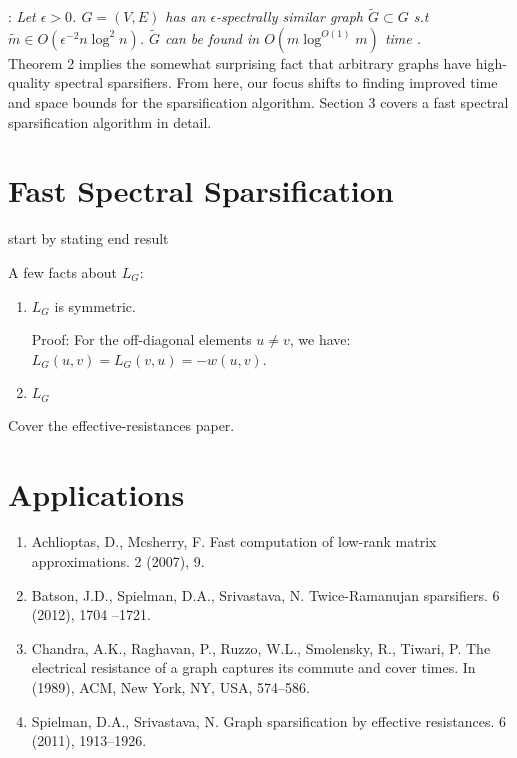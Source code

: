 \documentclass{article}
\begin{document}
\noindent
{}: \textit{Let $\epsilon > 0$. $G = (V,
E)$ has an $\epsilon$-spectrally similar graph $\tilde{G} \subset G$ s.t
$\tilde{m} \in O(\epsilon^{-2}n\log^2 n)$. $\tilde{G}$ can be found in
$O(m\log^{O(1)}m)$ time \cite{SpielmanTeng} \cite{TheSurvey}.} \\

Theorem 2 implies the somewhat surprising fact that arbitrary graphs have
high-quality spectral sparsifiers. From here, our focus shifts to finding
improved time and space bounds for the sparsification algorithm. Section 3
covers a fast spectral sparsification algorithm in detail.

\section{Fast Spectral Sparsification}

start by stating end result

A few facts about $L_G$:
\begin{enumerate}[1.]
    \item $L_G$ is symmetric.

        Proof: For the off-diagonal elements $u \not= v$, we have: $L_G(u,
        v) = L_G(v, u) = -w(u, v)$.

    \item $L_G$ 
\end{enumerate}

Cover the effective-resistances paper.

\section{Applications}




\begin{enumerate}[1.]
    \item Achlioptas, D., Mcsherry, F. Fast computation of low-rank matrix
        approximations. 2 (2007), 9.

    \item Batson, J.D., Spielman, D.A., Srivastava, N.  Twice-Ramanujan
        sparsifiers. 6 (2012), 1704 –1721.

    \item Chandra, A.K., Raghavan, P., Ruzzo, W.L., Smolensky, R., Tiwari,
        P.  The electrical resistance of a graph captures its commute and
        cover times. In (1989), ACM, New York, NY, USA, 574–586.

    \item Spielman, D.A., Srivastava, N. Graph sparsification by effective
        resistances.  6 (2011), 1913–1926.
\end{enumerate}
\end{document}
